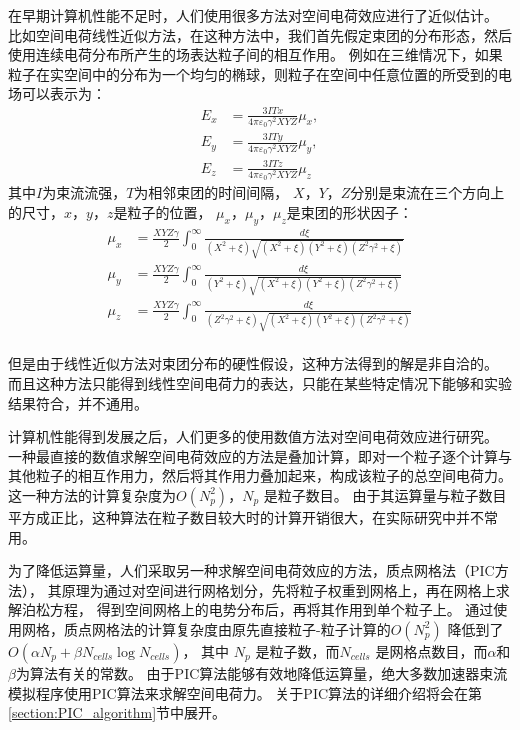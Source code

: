 在早期计算机性能不足时，人们使用很多方法对空间电荷效应进行了近似估计。
比如空间电荷线性近似方法，在这种方法中，我们首先假定束团的分布形态，然后使用连续电荷分布所产生的场表达粒子间的相互作用。
例如在三维情况下，如果粒子在实空间中的分布为一个均匀的椭球，则粒子在空间中任意位置的所受到的电场可以表示为\cite{lv2004beamoptic}：
\begin{equation}
    \label{eq:SpaceCharge3D}
    \begin{aligned}
    E_x &= \frac{3ITx}{4 \pi {\varepsilon}_{0} {\gamma}^2 XYZ}{\mu}_x, \\
    E_y &= \frac{3ITy}{4 \pi {\varepsilon}_{0} {\gamma}^2 XYZ}{\mu}_y, \\
    E_z &= \frac{3ITz}{4 \pi {\varepsilon}_{0} {\gamma}^2 XYZ}{\mu}_z
    \end{aligned}
\end{equation}
其中$I$为束流流强，$T$为相邻束团的时间间隔，
$X$，$Y$，$Z$分别是束流在三个方向上的尺寸，$x$，$y$，$z$是粒子的位置，
${\mu}_x$，${\mu}_y$，${\mu}_z$是束团的形状因子：
\begin{equation}
    \label{eq:SpaceCharge3D_mu}
    \begin{aligned}
    {\mu}_x &= \frac{XYZ\gamma}{2}   \int_0^{\infty}
    \frac{d\xi}{(X^2+\xi)            \sqrt{(X^2+\xi)(Y^2+\xi)(Z^2 {\gamma}^2+\xi)}}  \\
    {\mu}_y &= \frac{XYZ\gamma}{2}   \int_0^{\infty}
    \frac{d\xi}{(Y^2+\xi)            \sqrt{(X^2+\xi)(Y^2+\xi)(Z^2 {\gamma}^2+\xi)}}  \\
    {\mu}_z &= \frac{XYZ\gamma}{2}   \int_0^{\infty}
    \frac{d\xi}{(Z^2 {\gamma}^2+\xi) \sqrt{(X^2+\xi)(Y^2+\xi)(Z^2 {\gamma}^2+\xi)}}  \\
    \end{aligned}
\end{equation}

但是由于线性近似方法对束团分布的硬性假设，这种方法得到的解是非自洽的。
而且这种方法只能得到线性空间电荷力的表达，只能在某些特定情况下能够和实验结果符合，并不通用。

计算机性能得到发展之后，人们更多的使用数值方法对空间电荷效应进行研究。
一种最直接的数值求解空间电荷效应的方法是叠加计算，即对一个粒子逐个计算与其他粒子的相互作用力，然后将其作用力叠加起来，构成该粒子的总空间电荷力。
这一种方法的计算复杂度为$O(N_p^2)$，$N_p$ 是粒子数目。
由于其运算量与粒子数目平方成正比，这种算法在粒子数目较大时的计算开销很大，在实际研究中并不常用。

为了降低运算量，人们采取另一种求解空间电荷效应的方法，质点网格法（PIC方法），
其原理为通过对空间进行网格划分，先将粒子权重到网格上，再在网格上求解泊松方程，
得到空间网格上的电势分布后，再将其作用到单个粒子上。
通过使用网格，质点网格法的计算复杂度由原先直接粒子-粒子计算的$O(N_p^2)$ 降低到了$O(\alpha N_p + \beta N_{cells}\log{N_{cells}})$，
其中 $N_p$ 是粒子数，而$N_{cells}$ 是网格点数目，而$\alpha$和$\beta$为算法有关的常数。
由于PIC算法能够有效地降低运算量，绝大多数加速器束流模拟程序使用PIC算法来求解空间电荷力。
关于PIC算法的详细介绍将会在第\ref{section:PIC_algorithm}节中展开。

